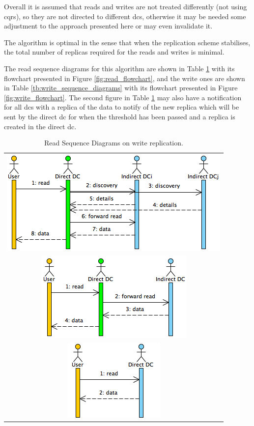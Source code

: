 \documentclass{acm_proc_article-sp}
\begin{document}
Overall it is assumed that reads and writes are not treated differently (not using \gls{cqrs}), so they are not directed to different \glspl{dc}, otherwise it may be needed some adjustment to the approach presented here or may even invalidate it.

The algorithm is optimal in the sense that when the replication scheme stabilises, the total number of replicas required for the reads and writes is minimal.

The read sequence diagrams for this algorithm are shown in Table \ref{tb:read_sequence_diagrams} with its flowchart presented in Figure \ref{fig:read_flowchart}, and the write ones are shown in Table \ref{tb:write_sequence_diagrams} with its flowchart presented in Figure \ref{fig:write_flowchart}. The second figure in Table \ref{tb:read_sequence_diagrams} may also have a notification for all \glspl{dc} with a replica of the data to notify of the new replica which will be sent by the direct \gls{dc} for when the threshold has been passed and a replica is created in the direct \gls{dc}.
\begin{table}[ht!]
	\begin{center}
		\begin{tabular}{c}
			\includegraphics[width=.48\textwidth]{figures/firstReadWithoutReplica.png} \\
			\includegraphics[width=.35\textwidth]{figures/readWithoutReplica.png} \\
			\includegraphics[width=.23\textwidth]{figures/readWithReplica.png}
		\end{tabular}
		
		\caption{Read Sequence Diagrams on write replication.}
		\label{tb:read_sequence_diagrams}
	\end{center}
\end{table}
\end{document}
